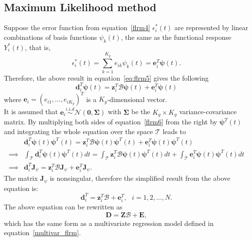 \subsection{Maximum Likelihood method}
Suppose the error function from equation~\eqref{flrm4} $\epsilon^{*}_i(t)$ are represented by linear combinations of basis functions $\psi_k(t)$, the same as the functional response $Y_i^{*}(t)$, that is,
\begin{equation}
\epsilon^{*}_i (t) = \sum_{k=1}^{K_y} e_{ik}\psi_k(t) = \bm{e}^T_i \bm{\psi}(t).
\end{equation}
Therefore, the above result in equation~\eqref{eq:flrm5} gives the following
\begin{equation}\label{flrm6}
\bm{d}_{i}^T \bm{\psi}(t) = \bm{z}_i^T \bm{\mathcal{B}} \bm{\psi}(t)+ \bm{e}^T_i \bm{\psi}(t)
\end{equation}
where $\bm{e}_i = \left(e_{i1},\dots,e_{i K_y}\right)^T$ is a $K_y$-dimensional vector.\\ It is assumed that $\bm{e}_i \stackrel{i.i.d}{\sim} \mathcal{N}(\bm{0}, \bm{\Sigma})$ with $\bm{\Sigma}$ be the $K_y \times K_y$ variance-covariance matrix. By multiplying both sides of equation~\eqref{flrm6} from the right by $\bm{\psi}^T(t)$ and integrating the whole equation over the space $\mathcal{T}$ leads to
\begin{align}
& \bm{d}_{i}^T \bm{\psi}(t)\bm{\psi}^T(t) = \bm{z}_i^T \bm{\mathcal{B}} \bm{\psi}(t)\bm{\psi}^T(t)+ \bm{e}^T_i \bm{\psi}(t)\bm{\psi}^T(t) \nonumber \\
\implies & \int_{\mathcal{T}} \bm{d}_{i}^T \bm{\psi}(t)\bm{\psi}^T(t) dt = \int_{\mathcal{T}} \bm{z}_i^T \bm{\mathcal{B}} \bm{\psi}(t)\bm{\psi}^T(t) dt +  \int_{\mathcal{T}} \bm{e}^T_i \bm{\psi}(t)\bm{\psi}^T(t) dt \nonumber \\
\implies & \bm{d}_{i}^T \bm{J}_{\psi} = \bm{z}_i^T \bm{\mathcal{B}} \bm{J}_{\psi}+ \bm{e}^T_i \bm{J}_{\psi}.
\end{align}
The matrix $\bm{J}_{\psi}$ is nonsingular, therefore the simplified result from the above equation is:
\begin{equation}\label{eq:flrm7}
\bm{d}_{i}^T = \bm{z}_i^T \bm{\mathcal{B}}  + \bm{e}^T_i,\text{ }i = 1,2,\dots,N.
\end{equation}
The above equation can be rewritten as
\begin{equation}\label{flrm7}
\bm{D} = \bm{Z} \bm{\mathcal{B}}  + \bm{E},
\end{equation}
which has the same form as a multivariate regression model defined in equation~\eqref{multivar_flrm}.
